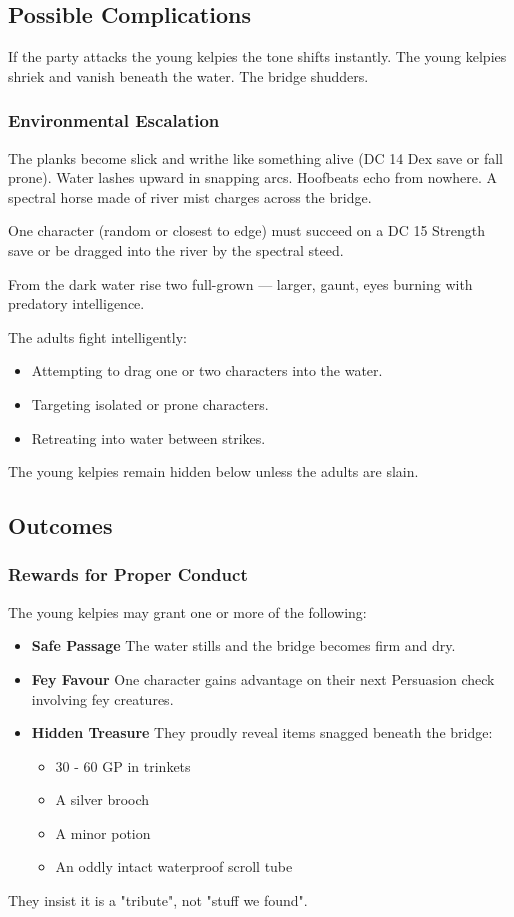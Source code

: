 \subsection*{Possible Complications}
{\entryfont If the party attacks the young kelpies the tone shifts instantly. The young kelpies shriek and vanish beneath the water. The bridge shudders.}

\subsubsection*{Environmental Escalation}
{\entryfont The planks become slick and writhe like something alive (DC 14 Dex save or fall prone). Water lashes upward in snapping arcs. Hoofbeats echo from nowhere. A spectral horse made of river mist charges across the bridge.

One character (random or closest to edge) must succeed on a DC 15 Strength save or be dragged into the river by the spectral steed.

From the dark water rise two full-grown \hyperref[monster:Kelpie]{} — larger, gaunt, eyes burning with predatory intelligence.

The adults fight intelligently:
\begin{itemize}
	\item Attempting to drag one or two characters into the water.
	\item Targeting isolated or prone characters.
	\item Retreating into water between strikes.
\end{itemize}
The young kelpies remain hidden below unless the adults are slain.}

\subsection*{Outcomes}
\subsubsection*{Rewards for Proper Conduct}
{\entryfont The young kelpies may grant one or more of the following:
\begin{itemize}
	\item \textbf{Safe Passage} The water stills and the bridge becomes firm and dry.
	\item \textbf{Fey Favour} One character gains advantage on their next Persuasion check involving fey creatures.
	\item \textbf{Hidden Treasure} They proudly reveal items snagged beneath the bridge:
	\begin{itemize}
		\item 30 - 60 GP in trinkets
		\item A silver brooch
		\item A minor potion
		\item An oddly intact waterproof scroll tube
	\end{itemize}
\end{itemize}
They insist it is a "tribute", not "stuff we found".}
